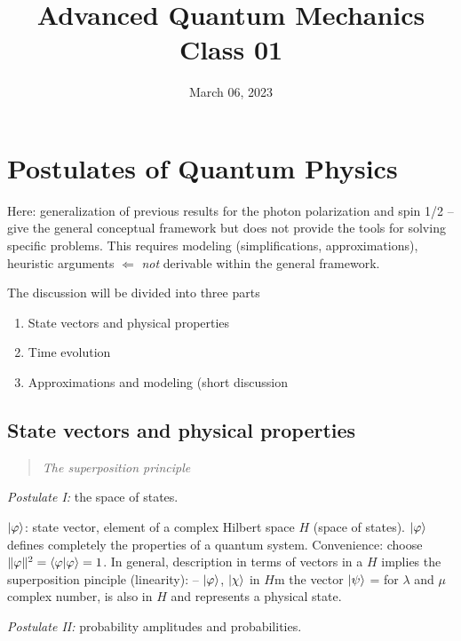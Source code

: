 \documentclass[12pt]{article}
\title{Advanced Quantum Mechanics\\Class 01}
\date{March 06, 2023}                                           %
\begin{document}
\maketitle

\setcounter{section}{2}


\section{Postulates of Quantum Physics}

Here: generalization of previous results for
the photon polarization and spin 1/2
-- give the general conceptual framework
but does not provide the tools for
solving specific problems.
This requires modeling (simplifications, approximations),
heuristic arguments $\Leftarrow$ \emph{not} derivable within 
the general framework.

The discussion will be divided into three parts
\begin{enumerate}
\item State vectors and physical properties
\item Time evolution
\item Approximations and modeling (short discussion
\end{enumerate}

\subsection{State vectors and physical properties}
\begin{quote}
\emph{The superposition principle}
\end{quote}

\emph{Postulate I:} the space of states.

$\ket{\varphi}$: state vector, element of a complex Hilbert 
 space $H$ (space of states).
 $\ket{\varphi}$ defines completely the properties of a quantum system.
Convenience: choose $\|\varphi\|^2 = \bra{\varphi}\ket{\varphi} = 1$.
In general, description in terms of vectors in a $H$
implies the superposition pinciple (linearity):
-- $\ket{\varphi}$, $\ket{\chi}$ in $H$m the vector $\ket{\psi}$
\be
\ket{\psi} = 
\ee
for $\lambda$ and $\mu$ complex number, is also in $H$
and represents a physical state.

\emph{Postulate II:} probability amplitudes and probabilities.
\end{document}
